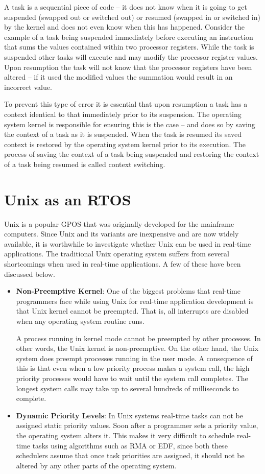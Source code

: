 \documentclass[12pt]{report}
\begin{document}
\begin{itemize}
     A task is a sequential piece of code – it does not know when it is going to get suspended (swapped out or switched out) or resumed (swapped in or switched in) by the kernel and does not even know when this has happened. Consider the example of a task being suspended immediately before executing an instruction that sums the values contained within two processor registers. While the task is suspended other tasks will execute and may modify the processor register values. Upon resumption the task will not know that the processor registers have been altered – if it used the modified values the summation would result in an incorrect value.
     
    To prevent this type of error it is essential that upon resumption a task has a context identical to that immediately prior to its suspension. The operating system kernel is responsible for ensuring this is the case – and does so by saving the context of a task as it is suspended. When the task is resumed its saved context is restored by the operating system kernel prior to its execution. The process of saving the context of a task being suspended and restoring the context of a task being resumed is called context switching.
 \end{itemize}
 
 \section{Unix as an RTOS}
 Unix is a popular GPOS that was originally developed for the mainframe computers. Since Unix and its variants are inexpensive and are now widely available, it is worthwhile to investigate whether Unix can be used in real-time applications. The traditional Unix operating system suffers from several shortcomings when used in real-time applications. A few of these have been discussed below. 
 \begin{itemize}
     \item \textbf{Non-Preemptive Kernel}: One of the biggest problems that real-time programmers face while using Unix for real-time application development is that Unix kernel cannot be preempted. That is, all interrupts are disabled when any operating system routine runs. 
     
     A process running in kernel mode cannot be preempted by other processes. In other words, the Unix kernel is non-preemptive. On the other hand, the Unix system does preempt processes running in the user mode. A consequence of this is that even when a low priority process makes a system call, the high priority processes would have to wait until the system call completes. The longest system calls may take up to several hundreds of milliseconds to complete. 
     \item \textbf{Dynamic Priority Levels}: In Unix systems real-time tasks can not be assigned static priority values. Soon after a programmer sets a priority value, the operating system alters it. This makes it very difficult to schedule real-time tasks using algorithms such as RMA or EDF, since both these schedulers assume that once task priorities are assigned, it should not be altered by any other parts of the operating system. 
 \end{itemize}
 
\end{document}
